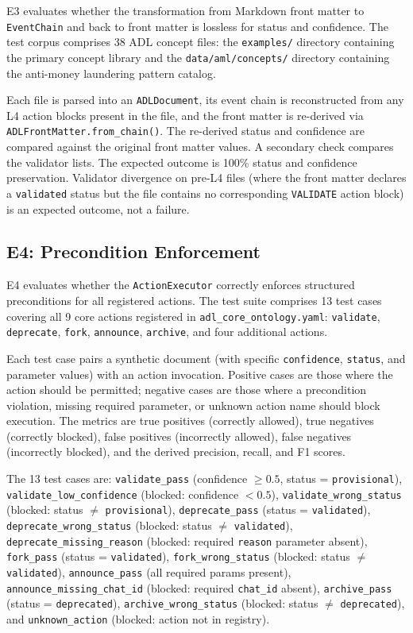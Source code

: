 E3 evaluates whether the transformation from Markdown front matter to \texttt{EventChain} and back to front matter is lossless for status and confidence. The test corpus comprises 38 ADL concept files: the \texttt{examples/} directory containing the primary concept library and the \texttt{data/aml/concepts/} directory containing the anti-money laundering pattern catalog.

Each file is parsed into an \texttt{ADLDocument}, its event chain is reconstructed from any L4 action blocks present in the file, and the front matter is re-derived via \texttt{ADLFrontMatter.from\_chain()}. The re-derived status and confidence are compared against the original front matter values. A secondary check compares the validator lists. The expected outcome is 100\% status and confidence preservation. Validator divergence on pre-L4 files (where the front matter declares a \texttt{validated} status but the file contains no corresponding \texttt{VALIDATE} action block) is an expected outcome, not a failure.

\subsection{E4: Precondition Enforcement}\label{e4-precondition-enforcement}

E4 evaluates whether the \texttt{ActionExecutor} correctly enforces structured preconditions for all registered actions. The test suite comprises 13 test cases covering all 9 core actions registered in \texttt{adl\_core\_ontology.yaml}: \texttt{validate}, \texttt{deprecate}, \texttt{fork}, \texttt{announce}, \texttt{archive}, and four additional actions.

Each test case pairs a synthetic document (with specific \texttt{confidence}, \texttt{status}, and parameter values) with an action invocation. Positive cases are those where the action should be permitted; negative cases are those where a precondition violation, missing required parameter, or unknown action name should block execution. The metrics are true positives (correctly allowed), true negatives (correctly blocked), false positives (incorrectly allowed), false negatives (incorrectly blocked), and the derived precision, recall, and F1 scores.

The 13 test cases are: \texttt{validate\_pass} (confidence \(\geq 0.5\), status = \texttt{provisional}), \texttt{validate\_low\_confidence} (blocked: confidence \(< 0.5\)), \texttt{validate\_wrong\_status} (blocked: status \(\neq\) \texttt{provisional}), \texttt{deprecate\_pass} (status = \texttt{validated}), \texttt{deprecate\_wrong\_status} (blocked: status \(\neq\) \texttt{validated}), \texttt{deprecate\_missing\_reason} (blocked: required \texttt{reason} parameter absent), \texttt{fork\_pass} (status = \texttt{validated}), \texttt{fork\_wrong\_status} (blocked: status \(\neq\) \texttt{validated}), \texttt{announce\_pass} (all required params present), \texttt{announce\_missing\_chat\_id} (blocked: required \texttt{chat\_id} absent), \texttt{archive\_pass} (status = \texttt{deprecated}), \texttt{archive\_wrong\_status} (blocked: status \(\neq\) \texttt{deprecated}), and \texttt{unknown\_action} (blocked: action not in registry).

